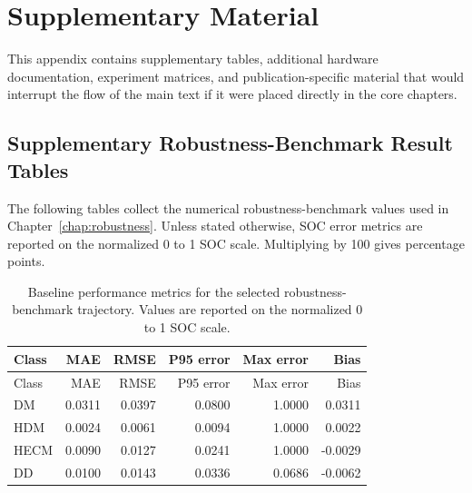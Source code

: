 \documentclass[
    a4paper,
    12pt,
    titlepage,
    bibliography=totoc,
    twoside=on,
    parskip=false,
    numbers=noenddot,
    cleardoublepage=empty,
    DIV=12,
    BCOR=12.0mm,
    headheight=36pt,
    headings=openright
]{scrreprt}
\begin{document}
\printbibliography

\appendix
\chapter{Supplementary Material}
This appendix contains supplementary tables, additional hardware documentation, experiment matrices, and publication-specific material that would interrupt the flow of the main text if it were placed directly in the core chapters.

\section{Supplementary Robustness-Benchmark Result Tables}
The following tables collect the numerical robustness-benchmark values used in Chapter~\ref{chap:robustness}. Unless stated otherwise, SOC error metrics are reported on the normalized 0 to 1 SOC scale. Multiplying by 100 gives percentage points.

\begingroup
\scriptsize
\setlength{\tabcolsep}{3pt}

\begin{longtable}{lrrrrr}
\caption[Baseline metrics for the robustness benchmark.]{Baseline performance metrics for the selected robustness-benchmark trajectory. Values are reported on the normalized 0 to 1 SOC scale.}\label{tab:robustness_appendix_baseline_metrics}\\
\toprule
Class & MAE & RMSE & P95 error & Max error & Bias \\
\midrule
\endfirsthead
\toprule
Class & MAE & RMSE & P95 error & Max error & Bias \\
\midrule
\endhead
DM & 0.0311 & 0.0397 & 0.0800 & 1.0000 & 0.0311 \\
HDM & 0.0024 & 0.0061 & 0.0094 & 1.0000 & 0.0022 \\
HECM & 0.0090 & 0.0127 & 0.0241 & 1.0000 & -0.0029 \\
DD & 0.0100 & 0.0143 & 0.0336 & 0.0686 & -0.0062 \\
\bottomrule
\end{longtable}
\end{document}
